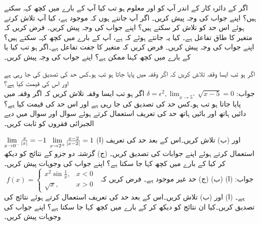 اگر  کے دائرہ کار کے اندر آپ کو  اور  معلوم ہو تب کیا آپ   کے بارے میں کچھ کہہ سکتے ہیں؟ اپنے جواب کی وجہ پیش کریں۔
اگر آپ جانتے ہوں کہ  موجود ہے، کیا آپ   تلاش کرتے ہوئے اس حد کو تلاش کر سکتے ہیں؟ اپنے جواب کی وجہ پیش کریں۔
فرض کریں کہ  متغیر  کا طاق تفاعل ہے۔ کیا یہ جانتے ہوئے کہ  ہے، آپ   کے بارے میں کچھ کہہ سکتے ہیں؟ اپنے جواب کی وجہ پیش کریں۔
فرض کریں کہ  متغیر  کا جفت تفاعل ہے۔اگر  ہو تب کیا  یا
   کے بارے میں کچھ کہنا ممکن ہے؟ اپنے جواب کی وجہ پیش کریں۔

اگر  ہو تب ایسا وقفہ  تلاش کریں کہ اگر  وقفہ  میں پایا جاتا ہو تب  ہو۔کس حد کی تصدیق کی جا رہی ہے اور اس کی قیمت کیا ہے؟ \\
جواب:\quad
$\delta=\epsilon^2,\lim_{x\to 5^+}\sqrt{x-5}=0$
اگر  ہو تب ایسا وقفہ  تلاش کریں کہ اگر  وقفہ  میں پایا جاتا ہو تب  ہو۔کس حد کی تصدیق کی جا رہی ہے اور اس حد کی قیمت کیا ہے؟
دائیں ہاتھ اور بائیں ہاتھ حد کی تعریف استعمال کرتے ہوئے سوال  اور سوال  میں دیے الجبرائی فقروں کو ثابت کریں۔

$\lim\limits_{x\to 0^-}\tfrac{x}{\abs{x}}=-1$
$\lim\limits_{x\to 2^+}\tfrac{x-2}{\abs{x-2}}=1$
(ا)  اور (ب)  تلاش کریں۔اس کے بعد حد کی تعریف استعمال کرتے ہوئے اپنے جوابات کی تصدیق کریں۔ (ج) گزشتہ دو جزو کے نتائج کو دیکھ کر کیا  کے بارے میں کچھ کہا جا سکتا ہے؟ اپنے جواب کی وجوہات پیش کریں۔\\
جواب:\quad
(ا)  (ب)  (ج) حد غیر موجود ہے۔
فرض کریں کہ 
$\,\,f(x)=\begin{cases}x^2\sin\tfrac{1}{x},&x<0\\ \sqrt{x},&x>0  \,\, \end{cases}$
ہے۔ (ا)  اور (ب)  تلاش کریں۔اس کے بعد حد کی تعریف استعمال کرتے ہوئے نتائج کی تصدیق کریں۔کیا ان نتائج کو دیکھ کر  کے بارے میں کچھ کہا جا سکتا ہے؟ اپنے جواب کی وجوہات  پیش کریں۔

